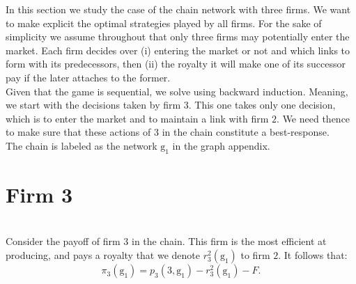 \documentclass{article}
\begin{document}
In this section we study the case of the chain network with three firms. We want to make explicit the optimal strategies played by all firms. For the sake of simplicity we assume throughout that only three firms may potentially enter the market. Each firm decides over (i) entering the market or not and which links to form with its predecessors, then (ii) the royalty it will make one of its successor pay if the later attaches to the former. \\

\indent Given that the game is sequential, we solve using backward induction. Meaning, we start with the decisions taken by firm $3$. This one takes only one decision, which is to enter the market and to maintain a link with firm $2$. We need thence to make sure that these actions of $3$ in the chain constitute a best-response. \\

The chain is labeled as the network $\text{g}_1$ in the graph appendix. 

\indent \chapter{\textbf{Firm 3}}\\
Consider the payoff of firm $3$ in the chain. This firm is the most efficient at producing, and pays a royalty that we denote $r^2_3(\text{g}_1)$ to firm $2$. It follows that: 
\begin{equation*}
    \pi_3(\text{g}_1)= p_3(3,\text{g}_1)-r^2_3(\text{g}_1)-F. 
\end{equation*}
\end{document}
